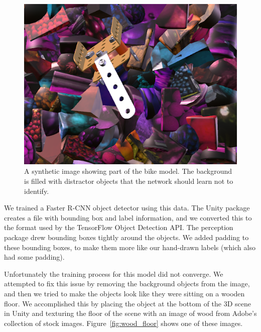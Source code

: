 \begin{figure}
  \includegraphics[width=\columnwidth]{figures/synthetic/perception_default.png}
  \caption{
    A synthetic image showing part of the bike model. The background is filled
    with distractor objects that the network should learn not to identify.
  }\label{fig:perception_default}
\end{figure}

We trained a Faster R-CNN object detector using this data.
The Unity package creates a file with bounding box and label information, and
we converted this to the format used by the TensorFlow Object Detection API.
The perception package drew bounding boxes tightly around the objects.
We added padding to these bounding boxes, to make them more like our hand-drawn
labels (which also had some padding).

Unfortunately the training process for this model did not converge.
We attempted to fix this issue by removing the background objects from the
image, and then we tried to make the objects look like they were sitting on a
wooden floor.
We accomplished this by placing the object at the bottom of the 3D scene in
Unity and texturing the floor of the scene with an image of wood from Adobe's
collection of stock images.
Figure~\ref{fig:wood_floor} shows one of these images.

